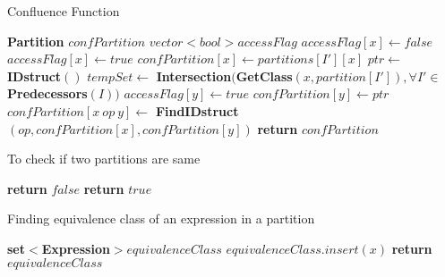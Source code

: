 \begin{algorithm}
\caption{Confluence Function}\label{ConfluenceFunction}
\begin{algorithmic}[1]
    \State \textbf{Partition} $confPartition$
    \State $vector<bool> accessFlag$
    \State
        $accessFlag[x] \gets false$
    \EndFor
    \State
            \State $accessFlag[x] \gets true$
                \State $confPartition[x] \gets partitions[I'][x]$
            \Else
                \State $ptr \gets$ \textbf{IDstruct}$()$
                \State $tempSet \gets$ \textbf{Intersection}$($\textbf{GetClass}$(x, partition[I']), \forall I'\in$\textbf{Predecessors}$(I))$
                    \State $accessFlag[y] \gets true$
                    \State $confPartition[y] \gets ptr$
                \EndFor
            \EndIf
        \EndIf
    \EndFor
    \State
        \State $confPartition[x\ op\ y] \gets$ \textbf{FindIDstruct}$(op, confPartition[x], confPartition[y])$
    \EndFor
    \State
    \State \textbf{return} $confPartition$
\EndProcedure
\end{algorithmic}
\end{algorithm}

\begin{algorithm}
\caption{To check if two partitions are same}\label{SamePartition}
\begin{algorithmic}[1]
            \State \textbf{return} $false$
        \EndIf
    \EndFor
    \State \textbf{return} $true$
\EndProcedure
\end{algorithmic}
\end{algorithm}

\begin{algorithm}
\caption{Finding equivalence class of an expression in a partition}\label{GetClass}
\begin{algorithmic}[1]
    \State {}
    \State \textbf{set}$<$\textbf{Expression}$> equivalenceClass$
            \State $equivalenceClass.insert(x)$
        \EndIf
    \EndFor
    \State \textbf{return} $equivalenceClass$
\EndProcedure
\end{algorithmic}
\end{algorithm}
